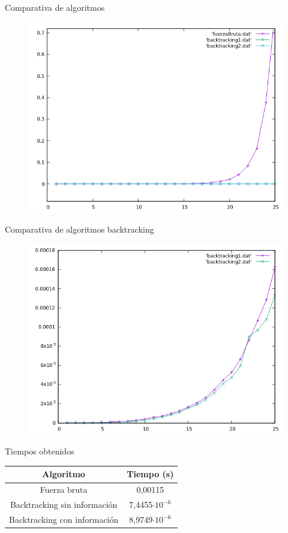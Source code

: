 \documentclass{beamer}
\begin{document}
\begin{frame}[fragile]{Comparativa de algoritmos}
\begin{figure}[H]
\centering
\includegraphics[scale=0.5]{todos.png}
\end{figure}
\end{frame}

\begin{frame}[fragile]{Comparativa de algoritmos backtracking}
\begin{figure}[H]
\centering
\includegraphics[scale=0.5]{ambos_backtracking.png}
\end{figure}
\end{frame}

\begin{frame}[fragile]{Tiempos obtenidos}
\begin{tabular}{|c|c|}
\hline
\textbf{Algoritmo} & \textbf{Tiempo (s)} \\
\hline
Fuerza bruta & 0,00115\\
\hline
Backtracking sin información & 7,4455$ \cdot 10^{-6}$ \\
\hline
Backtracking con información & 8,9749$ \cdot 10^{-6}$\\
\hline
\end{tabular}
\end{frame}
\end{document}
